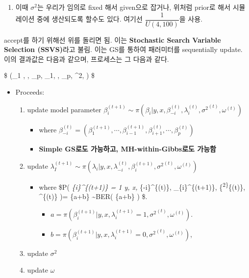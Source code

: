 \documentclass[
]{book}
\providecommand{\tightlist}{%
  \setlength{\itemsep}{0pt}\setlength{\parskip}{0pt}}
\begin{document}
\begin{enumerate}
\def\labelenumi{\arabic{enumi}.}
\tightlist
\item
  이때 \(\sigma^2\)는 우리가 임의로 fixed 해서 given으로 잡거나, 위처럼 prior로 해서 시뮬레이션 중에 생산되도록 할수도 있다. 여기선 \(\dfrac{1}{U(4,100)}\)을 사용.
\end{enumerate}

accept를 하기 위해선 위를 돌리면 됨. 이는 \textbf{Stochastic Search Variable Selection (SSVS)}라고 불림. 이는 GS를 통하여 패러미터를 sequentially update. 이의 결과값은 다음과 같으며, 프로세스는 그 다음과 같다.

\$
(\beta\_1 , \cdots, \beta\_p, \lambda\_1, \cdots, \lambda\_p, \sigma\^{}2, \omega)
\$

\begin{itemize}
\tightlist
\item
  Proceeds:

  \begin{enumerate}
  \def\labelenumi{\arabic{enumi}.}
  \tightlist
  \item
    update model parameter \(\beta_i^{(t+1)} \sim \pi( \beta_{i} \vert y, x, \beta_{-i}^{(t)}, \lambda_{i}^{(t)}, {\sigma^2}^{(t)}, \omega^{(t)} )\)

    \begin{itemize}
    \tightlist
    \item
      where \(\beta_{-i}^{(t)} = \left( \beta_{1}^{(t+1)}, \cdots, \beta_{i-1}^{(t+1)}, \beta_{i+1}^{(t)}, \cdots, \beta_{p}^{(t)} \right)\)
    \item
      \textbf{Simple GS로도 가능하고, MH-within-Gibbs로도 가능함}
    \end{itemize}
  \item
    update \(\lambda_I^{(t+1)} \sim \pi(\lambda_i \vert y, x, \lambda_{-i}^{(t)}, \beta_{i}^{(t+1)}, {\sigma^2}^{(t)}, \omega^{(t)} )\)

    \begin{itemize}
    \tightlist
    \item
      where \$P( \lambda\emph{\{i\}\^{}\{(t+1)\} = 1 \vert y, x, \lambda}\{-i\}\^{}\{(t)\}, \beta\_\{i\}\^{}\{(t+1)\}, \{\sigma\textsuperscript{2\}}\{(t)\}, \omega\^{}\{(t)\} )=  \{a+b\} \sim BER( \{a+b\} ) \$.

      \begin{itemize}
      \tightlist
      \item
        \(a = \pi( \beta_{i}^{(t+1)} \vert y, x, \lambda_{i}^{(t+1)}=1, {\sigma^2}^{(t)}, \omega^{(t)} )\).
      \item
        \(b = \pi( \beta_{i}^{(t+1)} \vert y, x, \lambda_{i}^{(t+1)}=0, {\sigma^2}^{(t)}, \omega^{(t)} )\),
      \end{itemize}
    \end{itemize}
  \item
    update \(\sigma^2\)
  \item
    update \(\omega\)
  \end{enumerate}
\end{itemize}
\end{document}
